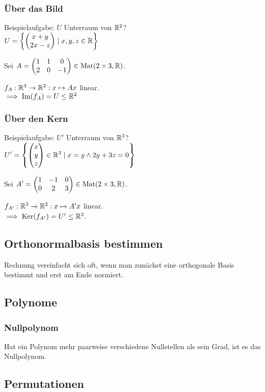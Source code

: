 \subsubsection*{Über das Bild}
Beispielaufgabe: $U$ Unterraum von $\mathbb{R}^2$? \\
$\displaystyle U=\left\{\begin{pmatrix} x+y \\ 2x-z \end{pmatrix} \mid x,y,z\in\mathbb{R} \right\}$

Sei $\displaystyle A=\begin{pmatrix} 1 & 1 & 0 \\ 2 & 0 & -1 \end{pmatrix} \in\operatorname{Mat}(2 \times 3, \mathbb{R})$.

$f_A: \mathbb{R}^3 \to \mathbb{R}^2: x \mapsto Ax$ linear. \\
$\implies \operatorname{Im}(f_A)=U \le \mathbb{R}^2$

\subsubsection*{Über den Kern}
Beispielaufgabe: $U'$ Unterraum von $\mathbb{R}^3$? \\
$\displaystyle U'=\left\{\begin{pmatrix} x\\y\\z \end{pmatrix}\in\mathbb{R}^3 \mid x=y \land 2y+3z=0\right\}$

Sei $\displaystyle A'=\begin{pmatrix} 1 & -1 & 0 \\ 0 & 2 & 3 \end{pmatrix} \in\operatorname{Mat}(2\times3, \mathbb{R})$.

$f_{A'}: \mathbb{R}^3 \to \mathbb{R}^2: x\mapsto A'x$ linear. \\
$\implies \operatorname{Ker}(f_{A'})=U' \le \mathbb{R}^3$.

\subsection*{Orthonormalbasis bestimmen}
Rechnung vereinfacht sich oft,
wenn man zunächst eine orthogonale Basis bestimmt
und erst am Ende normiert.

\subsection*{Polynome}
\subsubsection*{Nullpolynom}
Hat ein Polynom mehr paarweise verschiedene Nullstellen als sein Grad,
ist es das Nullpolynom.

\subsection*{Permutationen}

